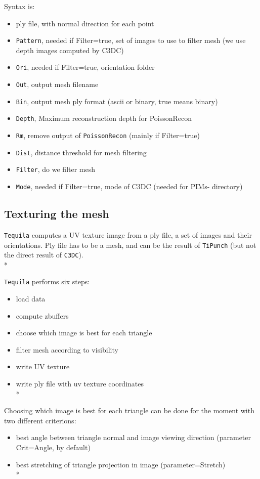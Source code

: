Syntax is:

\begin{itemize}
  \item ply file, with normal direction for each point
  \item {\tt Pattern}, needed if Filter=true, set of images to use to filter mesh (we use depth images computed by C3DC)
  \item {\tt Ori}, needed if Filter=true, orientation folder
  \item {\tt Out}, output mesh filename
  \item {\tt Bin}, output mesh ply format (ascii or binary, true means binary)
  \item {\tt Depth}, Maximum reconstruction depth for PoissonRecon
  \item {\tt Rm}, remove output of {\tt PoissonRecon} (mainly if Filter=true)
  \item {\tt Dist}, distance threshold for mesh filtering
  \item {\tt Filter}, do we filter mesh
  \item {\tt Mode}, needed if Filter=true, mode of C3DC (needed for PIMs- directory)
\end{itemize}

\subsection{Texturing the mesh}

{\tt Tequila} computes a UV texture image from a ply file, a set of images and their orientations. Ply file has to be a mesh, and can be the result of {\tt TiPunch} (but not the direct result of {\tt C3DC}).\\*

{\tt Tequila} performs six steps:

\begin{itemize}
    \item load data
    \item compute zbuffers
    \item choose which image is best for each triangle
    \item filter mesh according to visibility
    \item write UV texture
    \item write ply file with uv texture coordinates\\*
\end{itemize}

Choosing which image is best for each triangle can be done for the moment with two different criterions:
\begin{itemize}
\item   best angle between triangle normal and image viewing direction (parameter Crit=Angle, by default)
\item   best stretching of triangle projection in image (parameter=Stretch)\\*
\end{itemize}

